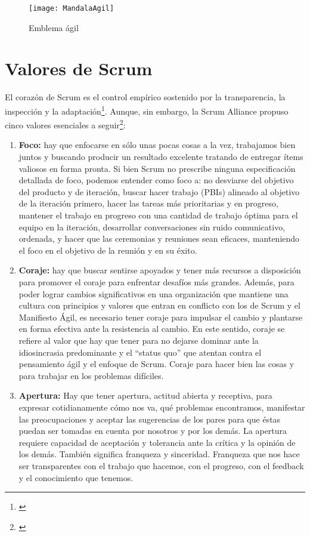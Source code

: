 \begin{figure}[h]
  \centering
  \texttt{[image: MandalaAgil]}
  \caption{Emblema ágil}
  \centering
  \label{fig:MandalaAgil} %
\end{figure}

\section{Valores de Scrum}

El corazón de Scrum es el control empírico sostenido por la transparencia, la inspección y la adaptación\footnote{\cite{Ken-Jeff-2013}}. Aunque, sin embargo, la Scrum Alliance propuso cinco valores esenciales a seguir\footnote{\cite{Scrum-Alliance-2015}}: 

\begin{enumerate}
\item \textbf{Foco:} hay que enfocarse en sólo unas pocas cosas a la vez, trabajamos bien juntos y buscando producir un resultado excelente tratando de entregar ítems valiosos en forma pronta. Si bien Scrum no prescribe ninguna especificación detallada de foco, podemos entender como foco a: no desviarse del objetivo del producto y de iteración, buscar hacer trabajo (PBIs) alineado al objetivo de la iteración primero, hacer las tareas más prioritarias y en progreso, mantener el trabajo en progreso con una cantidad de trabajo óptima para el equipo en la iteración, desarrollar conversaciones sin ruido comunicativo, ordenada, y hacer que las ceremonias y reuniones sean eficaces, manteniendo el foco en el objetivo de la reunión y en su éxito.

\item \textbf{Coraje:} hay que buscar sentirse apoyados y tener más recursos a disposición para promover el coraje para enfrentar desafíos más grandes. Además, para poder lograr cambios significativos en una organización que mantiene una cultura con principios y valores que entran en conflicto con los de Scrum y el Manifiesto Ágil, es necesario tener coraje para impulsar el cambio y plantarse en forma efectiva ante la resistencia al cambio. En este sentido, coraje se refiere al valor que hay que tener para no dejarse dominar ante la idiosincrasia predominante y el “status quo” que atentan contra el pensamiento ágil y el enfoque de Scrum. Coraje para hacer bien las cosas y para trabajar en los problemas difíciles.

\item \textbf{Apertura:} Hay que tener apertura, actitud abierta y receptiva, para expresar cotidianamente cómo nos va, qué problemas encontramos, manifestar las preocupaciones y aceptar las sugerencias de los pares para que éstas puedan ser tomadas en cuenta por nosotros y por los demás. La apertura requiere capacidad de aceptación y tolerancia ante la crítica y la opinión de los demás. También significa franqueza y sinceridad. Franqueza que nos hace ser transparentes con el trabajo que hacemos, con el progreso, con el feedback y el conocimiento que tenemos. 


\end{enumerate}
